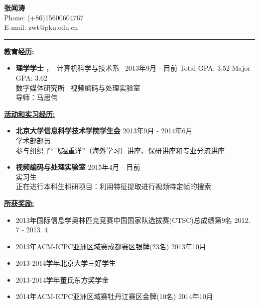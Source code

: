 \documentclass[UTF8]{ctexart}
\begin{document}
\begin{center}
  {\Huge \textbf{张闻涛}}\\
  \large{Phone: (+86)15600604767}\\
  \large{E-mail: zwt@pku.edu.cn} \\
\end{center}
  \rule[4pt]{18cm}{0.5pt}
  \smallskip
  {\large \textbf{\underline{教育经历:}}}\\
  \begin{itemize}
 \item \textbf{理学学士} ，\ 计算机科学与技术系 \ \qquad \hfill{2013年9月 - 目前}
   \smallskip
             \newline \hphantom{理学学士 \qquad } {\small Total GPA: 3.52 \qquad Major GPA: 3.62 } \\
	\smallskip
	\small 数字媒体研究所 \ 视频编码与处理实验室 \\
	\smallskip
	\small 导师：马思伟


\end{itemize}

\medskip
{\large \textbf{\underline{活动和实习经历:}}}\\
\begin{itemize}
\item \textbf{北京大学信息科学技术学院学生会} \hfill{2013年9月 - 2014年6月}\\
\smallskip
{学术部部员} \\
\smallskip
\small{参与组织了“飞越重洋”（海外学习）讲座、保研讲座和专业分流讲座} 
\smallskip
\normalsize
\item \textbf{视频编码与处理实验室} \hfill{2015年4月 - 目前}\\
\smallskip
{实习生}\\
\small{正在进行本科生科研项目：利用特征提取进行视频特定帧的搜索}
\end{itemize}

\medskip
{\large \textbf{\underline{所获奖励:}}}\\
\begin{itemize}
\item  2013年国际信息学奥林匹克竞赛中国国家队选拔赛(CTSC)总成绩第9名 \hfill{2012. 7 - 2013. 4}\\
\item  2013年ACM-ICPC亚洲区域赛成都赛区银牌(23名) \hfill{2013年10月}\\
\item  2013-2014学年北京大学三好学生 \\
\item  2013-2014学年董氏东方奖学金 \\
\item  2014年ACM-ICPC亚洲区域赛牡丹江赛区金牌(10名) \hfill{2014年10月}\\

\end{itemize}
\end{document}
